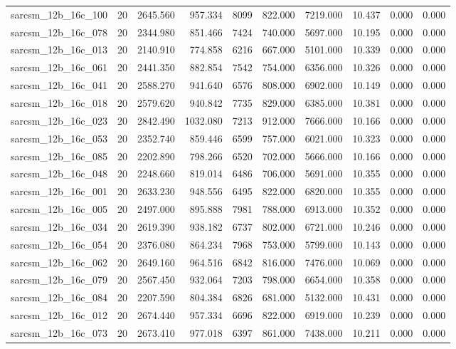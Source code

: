 \begin{tabular}{lrrrrrrrrr}
sarcsm\_12b\_16c\_100 & 20 & 2645.560 & 957.334 & 8099 & 822.000 & 7219.000 & 10.437 & 0.000 & 0.000 \\
sarcsm\_12b\_16c\_078 & 20 & 2344.980 & 851.466 & 7424 & 740.000 & 5697.000 & 10.195 & 0.000 & 0.000 \\
sarcsm\_12b\_16c\_013 & 20 & 2140.910 & 774.858 & 6216 & 667.000 & 5101.000 & 10.339 & 0.000 & 0.000 \\
sarcsm\_12b\_16c\_061 & 20 & 2441.350 & 882.854 & 7542 & 754.000 & 6356.000 & 10.326 & 0.000 & 0.000 \\
sarcsm\_12b\_16c\_041 & 20 & 2588.270 & 941.640 & 6576 & 808.000 & 6902.000 & 10.149 & 0.000 & 0.000 \\
sarcsm\_12b\_16c\_018 & 20 & 2579.620 & 940.842 & 7735 & 829.000 & 6385.000 & 10.381 & 0.000 & 0.000 \\
sarcsm\_12b\_16c\_023 & 20 & 2842.490 & 1032.080 & 7213 & 912.000 & 7666.000 & 10.166 & 0.000 & 0.000 \\
sarcsm\_12b\_16c\_053 & 20 & 2352.740 & 859.446 & 6599 & 757.000 & 6021.000 & 10.323 & 0.000 & 0.000 \\
sarcsm\_12b\_16c\_085 & 20 & 2202.890 & 798.266 & 6520 & 702.000 & 5666.000 & 10.166 & 0.000 & 0.000 \\
sarcsm\_12b\_16c\_048 & 20 & 2248.660 & 819.014 & 6486 & 706.000 & 5691.000 & 10.355 & 0.000 & 0.000 \\
sarcsm\_12b\_16c\_001 & 20 & 2633.230 & 948.556 & 6495 & 822.000 & 6820.000 & 10.355 & 0.000 & 0.000 \\
sarcsm\_12b\_16c\_005 & 20 & 2497.000 & 895.888 & 7981 & 788.000 & 6913.000 & 10.352 & 0.000 & 0.000 \\
sarcsm\_12b\_16c\_034 & 20 & 2619.390 & 938.182 & 6737 & 802.000 & 6721.000 & 10.246 & 0.000 & 0.000 \\
sarcsm\_12b\_16c\_054 & 20 & 2376.080 & 864.234 & 7968 & 753.000 & 5799.000 & 10.143 & 0.000 & 0.000 \\
sarcsm\_12b\_16c\_062 & 20 & 2649.160 & 964.516 & 6842 & 816.000 & 7476.000 & 10.069 & 0.000 & 0.000 \\
sarcsm\_12b\_16c\_079 & 20 & 2567.450 & 932.064 & 7203 & 798.000 & 6654.000 & 10.358 & 0.000 & 0.000 \\
sarcsm\_12b\_16c\_084 & 20 & 2207.590 & 804.384 & 6826 & 681.000 & 5132.000 & 10.431 & 0.000 & 0.000 \\
sarcsm\_12b\_16c\_012 & 20 & 2674.440 & 957.334 & 6696 & 822.000 & 6919.000 & 10.239 & 0.000 & 0.000 \\
sarcsm\_12b\_16c\_073 & 20 & 2673.410 & 977.018 & 6397 & 861.000 & 7438.000 & 10.211 & 0.000 & 0.000 \\

\end{tabular}

